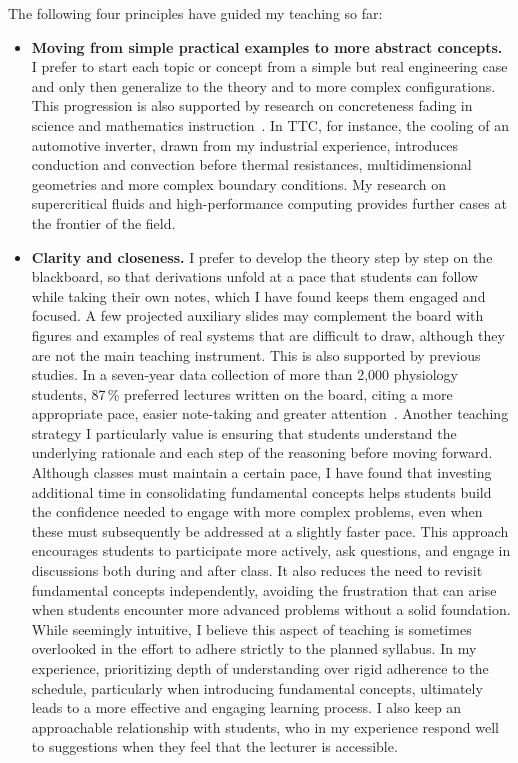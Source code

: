 \documentclass[11pt]{article}
\newcommand{\NEW}[1]{\iffinal #1\else{\color{red}#1}\fi}
\begin{document}
The following four principles have guided my teaching so far:
\begin{itemize}
  \item \textbf{Moving from simple practical examples to more abstract concepts.} 
  I prefer to start each topic or concept from a simple but real engineering case and only then generalize to the theory and to more complex configurations.
  This progression is also supported by research on concreteness fading in science and mathematics
  instruction~\cite{Fyfe2014}. 
  In TTC, for instance, the cooling of an automotive inverter, drawn from my industrial experience, introduces conduction and convection before thermal resistances, multidimensional geometries and more complex boundary conditions. 
  My research on supercritical fluids and high-performance computing provides further cases at the
  frontier of the field.
  
  \item \textbf{Clarity and closeness.} 
  I prefer to develop the theory step by step on the blackboard, so that derivations unfold at a pace that students can follow while taking their own notes, which I have found keeps them engaged and focused. 
  A few projected auxiliary slides may complement the board with figures and examples of real systems that are difficult to draw, although they are not the main teaching instrument.
  This is also supported by previous \NEW{studies}. In a seven-year data collection of more than 2,000 physiology students, 87\,\% preferred lectures written on the board, citing a more appropriate pace, easier note-taking and greater attention~\cite{Armour2016}. Another teaching strategy I particularly value is ensuring that students understand the underlying rationale and each step of the reasoning before moving forward. Although classes must maintain a certain pace, I have found that investing additional time in consolidating fundamental concepts helps students build the confidence needed to engage with more complex problems, even when these must subsequently be addressed at a slightly faster pace. This approach encourages students to participate more actively, ask questions, and engage in discussions both during and after class. It also reduces the need to revisit fundamental concepts independently, avoiding the frustration that can arise when students encounter more advanced problems without a solid foundation. While seemingly intuitive, I believe this aspect of teaching is sometimes overlooked in the effort to adhere strictly to the planned syllabus. In my experience, prioritizing depth of understanding over rigid adherence to the schedule, particularly when introducing fundamental concepts, ultimately leads to a more effective and engaging learning process.
  I also keep an approachable relationship with students, who in my experience respond well to suggestions when
  they feel that the lecturer is accessible.
  

\end{itemize}
\end{document}
